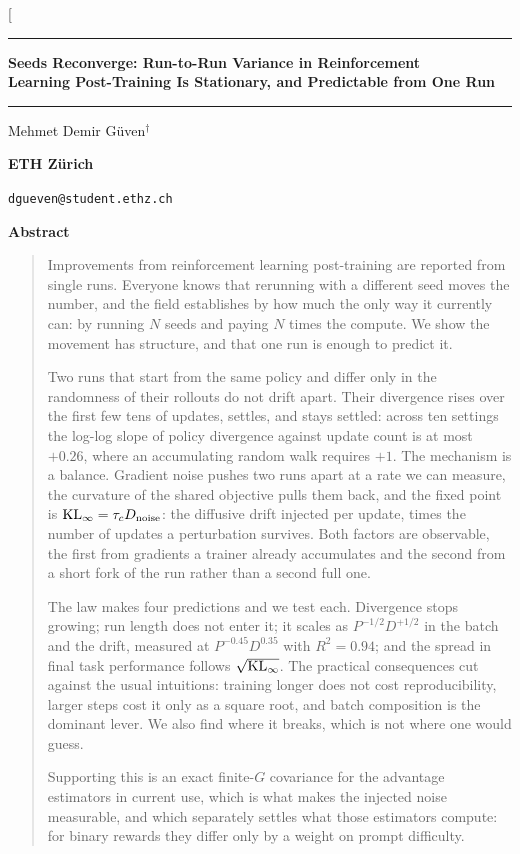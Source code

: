 \documentclass[10pt,twocolumn]{article}
\theoremstyle{definition}
\newcommand{\ruledtitle}[1]{%
  \par\noindent\rule{\textwidth}{1.6pt}\par\vspace{3pt}
  {\centering\fontsize{15}{17}\selectfont\bfseries #1\par}
  \vspace{3pt}\noindent\rule{\textwidth}{0.4pt}\par
}
\begin{document}
\twocolumn[
  \ruledtitle{Seeds Reconverge: Run-to-Run Variance in Reinforcement\\
  Learning Post-Training Is Stationary, and Predictable from One Run}
  \vspace{6pt}
  {\centering
    \normalsize Mehmet Demir G\"uven$^{\dagger}$\par\vspace{2pt}
    \normalsize\textbf{ETH Z\"urich}\par\vspace{1pt}
    \small\texttt{dgueven@student.ethz.ch}\par
  }
  \vspace{6pt}
  \begin{minipage}{\textwidth}
  \begin{center}\textbf{Abstract}\end{center}
  \vspace{-4pt}
  \begin{quote}
  Improvements from reinforcement learning post-training are reported from single runs. Everyone
  knows that rerunning with a different seed moves the number, and the field establishes by how much
  the only way it currently can: by running $N$ seeds and paying $N$ times the compute. We show the
  movement has structure, and that one run is enough to predict it.

  Two runs that start from the same policy and differ only in the randomness of their rollouts do
  not drift apart. Their divergence rises over the first few tens of updates, settles, and stays
  settled: across ten settings the log-log slope of policy divergence against update count is at
  most $+0.26$, where an accumulating random walk requires $+1$. The mechanism is a balance.
  Gradient noise pushes two runs apart at a rate we can measure, the curvature of the shared
  objective pulls them back, and the fixed point is $\mathrm{KL}_\infty = \tau_c D_{\mathrm{noise}}$: the
  diffusive drift injected per update, times the number of updates a perturbation survives. Both
  factors are observable, the first from gradients a trainer already accumulates and the second from
  a short fork of the run rather than a second full one.

  The law makes four predictions and we test each. Divergence stops growing; run length does not
  enter it; it scales as $P^{-1/2} D^{+1/2}$ in the batch and the drift, measured at
  $P^{-0.45} D^{0.35}$ with $R^2 = 0.94$; and the spread in final task performance follows
  $\sqrt{\mathrm{KL}_\infty}$. The practical consequences cut against the usual intuitions: training longer
  does not cost reproducibility, larger steps cost it only as a square root, and batch composition
  is the dominant lever. We also find where it breaks, which is not where one would guess.

  Supporting this is an exact finite-$G$ covariance for the advantage estimators in current use,
  which is what makes the injected noise measurable, and which separately settles what those
  estimators compute: for binary rewards they differ only by a weight on prompt difficulty.
    \end{quote}
  \end{minipage}
\end{document}
